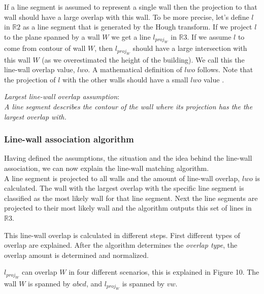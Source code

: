 \documentclass[10pt]{article}
\begin{document}
	If a line segment is assumed to represent a single wall then the projection
	to that wall should have a large overlap with this wall.  To be more
	precise, let's define $l$ in $\mathbb{R}2$ as a line segment that is
	generated by the Hough transform.  If we project $l$ to the plane spanned
	by a wall $W$ we get a line $l_{proj_W}$ in $\mathbb{R}3$.  If we assume
	$l$ to come from contour of wall $W$, then $l_{proj_W}$ should have a large
	intersection with this wall $W$ (as we overestimated the height of the
	building). We call this the line-wall overlap value, $lwo$.  A mathematical
	definition of $lwo$ follows.  Note that the projection of $l$ with the
	other walls should have a small $lwo$ value .

	\emph{Largest line-wall overlap assumption}:\\
	\emph{A line segment describes the contour of the wall where its projection
	has the the largest overlap with.}\\

	\subsubsection{Line-wall association algorithm}
	Having defined the assumptions, the situation and the idea behind the
	line-wall association, we can now explain the line-wall matching algorithm.\\
	A line segment is projected to all walls and the amount of line-wall
	overlap, $lwo$ is calculated. The wall with the largest overlap with the specific line
segment is classified as the most likely wall for that line segment.
	Next the line segments are projected to their most likely wall and the
	algorithm outputs this set of lines in $\mathbb{R}3$. 
	
	This line-wall overlap is calculated in different steps.
	First different types of overlap are explained. After the algorithm
	determines the \emph{overlap type}, the overlap amount is determined and
	normalized.

	$l_{proj_W}$ can overlap $W$ in four different scenarios, this is explained
	in Figure 10. The wall $W$ is spanned by $abcd$, and $l_{proj_W}$ is spanned
	by $vw$.
	
\end{document}

